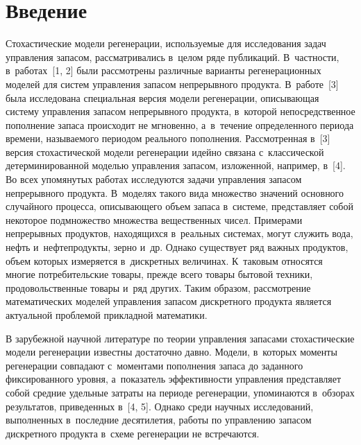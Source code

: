 


\thispagestyle{headings}

\begin{multicols}{2}

\label{st\stat}


\section{Введение}

  Стохастические модели регенерации, используемые для исследования задач 
управления запасом, рассматривались в~целом ряде пуб\-ли\-ка\-ций. В~част\-ности, 
в~работах~[1, 2] были рассмотрены различные варианты регенерационных 
моделей для сис\-тем управ\-ле\-ния запасом непрерывного продукта. В~работе~[3] 
была исследована специальная версия модели регенерации, описывающая 
систему управ\-ле\-ния запасом непрерывного продукта, в~которой 
непосредственное пополнение запаса происходит не мгновенно, а~в~течение 
определенного периода времени, называемого периодом реального пополнения. 
Рассмотренная в~[3] версия стохастической модели регенерации идейно 
связана с~классической детерминированной моделью управ\-ле\-ния запасом, 
изложенной, например, в~[4].
  Во всех упомянутых работах исследуются задачи управления запасом 
непрерывного продукта. В~моделях такого вида множество значений 
основного случайного процесса, описывающего объем запаса в~системе, 
представляет собой некоторое подмножество множества вещественных чисел. 
Примерами непрерывных продуктов, находящихся в~реальных сис\-те\-мах, могут 
служить вода, нефть и~нефтепродукты, зерно и~др. Однако существует ряд 
важных продуктов, объем которых измеряется в~дискретных величинах. 
К~таковым относятся многие потребительские товары, прежде всего товары 
бытовой техники, продовольственные товары и~ряд других. Таким образом, 
рассмотрение математических моделей управ\-ле\-ния запасом дискретного 
продукта является актуальной проблемой прикладной математики.
  
  В зарубежной научной литературе по теории управления запасами 
стохастические модели регенерации известны достаточно давно. Модели,\linebreak 
в~которых моменты регенерации совпадают с~моментами пополнения запаса до 
заданного фиксированного уровня, а~показатель эф\-фек\-тив\-ности управ\-ле\-ния 
пред\-став\-ля\-ет собой средние удельные за\-тра\-ты на периоде регенерации, 
упоминаются в~обзорах результатов, приведенных в~[4, 5]. Однако среди 
научных исследований, выполненных в~последние десятилетия, работы по 
управлению запасом дискретного продукта в~схеме регенерации не 
встречаются.


\end{multicols}
